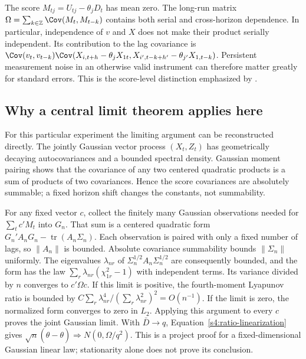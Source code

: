 The score $M_{tj}=U_{tj}-\theta_jD_t$ has mean zero. The long-run matrix
$\Omega=\sum_{k\in\mathbb Z}\Cov(M_t,M_{t-k})$ contains both serial
and cross-horizon dependence. In particular, independence of $v$ and $X$
does not make their product serially independent. Its contribution to
the lag covariance is
$\Cov(v_t,v_{t-k})\Cov(X_{i,t+h}-\theta_jX_{1t},
X_{i',t-k+h'}-\theta_{j'}X_{1,t-k})$.
Persistent measurement noise in an otherwise valid instrument can therefore
matter greatly for standard errors. This is the score-level distinction
emphasized by \citet[Section 2.3]{stock2018}.

\subsection{Why a central limit theorem applies here}
For this particular experiment the limiting argument can be reconstructed
directly. The jointly Gaussian vector process $(X_t,Z_t)$ has geometrically
decaying autocovariances and a bounded spectral density. Gaussian moment
pairing shows that the covariance of any two centered quadratic products
is a sum of products of two covariances. Hence the score covariances are
absolutely summable; a fixed horizon shift changes the constants, not
summability.

For any fixed vector $c$, collect the finitely many Gaussian observations
needed for $\sum_tc'M_t$ into $G_n$. That sum is a centered quadratic
form $G_n'A_nG_n-\operatorname{tr}(A_n\Sigma_n)$. Each observation is
paired with only a fixed number of lags, so $\|A_n\|$ is bounded.
Absolute covariance summability bounds $\|\Sigma_n\|$ uniformly. The
eigenvalues $\lambda_{nr}$ of
$\Sigma_n^{1/2}A_n\Sigma_n^{1/2}$ are consequently bounded, and the form
has the law $\sum_r\lambda_{nr}(\chi_{1r}^2-1)$ with independent terms.
Its variance divided by $n$ converges to $c'\Omega c$. If this limit is
positive, the fourth-moment Lyapunov ratio is bounded by
$C\sum_r\lambda_{nr}^4/(\sum_r\lambda_{nr}^2)^2=O(n^{-1})$.
If the limit is zero, the normalized form converges to zero in $L_2$.
Applying this argument to every $c$ proves the joint Gaussian limit.
With $\bar D\to q$, Equation~\eqref{s4:ratio-linearization} gives
$\sqrt n(\widehat\theta-\theta)\Rightarrow N(0,\Omega/q^2)$.
This is a project proof for a fixed-dimensional Gaussian linear law;
stationarity alone does not prove its conclusion.

